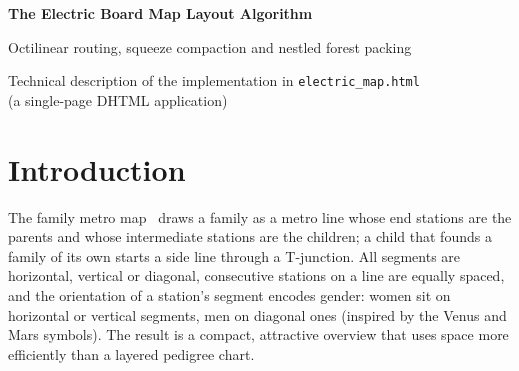 \documentclass[11pt,a4paper]{article}
\theoremstyle{remark}
\begin{document}
\begin{center}
  {\LARGE\bfseries The Electric Board Map Layout Algorithm\par}
  \vspace{4pt}
  {\large Octilinear routing, squeeze compaction and nestled forest packing\par}
  \vspace{18pt}
  {\large Technical description of the implementation in \texttt{electric\_map.html}\\
  (a single-page DHTML application)\par}
\end{center}
\vspace{6pt}

\begin{abstract}
Korst, Pronk and van Wijk's \emph{family metro map} draws family relations in the octilinear style of the London
Underground, with segment orientation encoding gender: orthogonal for women, diagonal for men~\cite{korst2020}. The
\emph{Electric Board Map} carries this style and gender rule over to a printed circuit board: vertices of a forest
become \emph{pads} on grid points, edges become \emph{traces} of unit octilinear steps, and the direction of the last
step into a vertex encodes its gender. The algorithm targets forests made of \emph{large} trees ($\ge 9$ vertices) and
many \emph{small} ones ($\le 3$). Large trees are routed generation by generation with straight, one-bend, dogleg and
chamfered-corner traces, a cost that rewards parallel ``bus'' runs, exact branch-and-bound pruning, and a squeeze pass
that rips up and reroutes the board's sides. Small trees are never routed: they are drawn from straight-only templates
(a two-vertex tree is always one straight trace) and nestled into the gaps of the large trees on a flat board grid.
We define the model, prove its key properties, give all constants, and report measurements.
\end{abstract}

\tableofcontents

\section{Introduction}

The family metro map~\cite{korst2020} draws a family as a metro line whose end stations are the parents and whose
intermediate stations are the children; a child that founds a family of its own starts a side line through a
T-junction. All segments are horizontal, vertical or diagonal, consecutive stations on a line are equally spaced, and
the orientation of a station's segment encodes gender: women sit on horizontal or vertical segments, men on
diagonal ones (inspired by the Venus and Mars symbols). The result is a compact, attractive overview that uses
space more efficiently than a layered pedigree chart.
\end{document}
